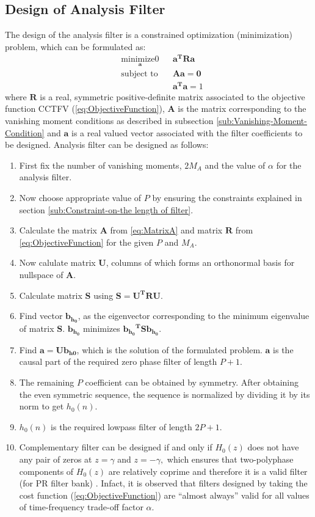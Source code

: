 \subsection{Design of Analysis Filter}
The design of the analysis filter is a constrained optimization (minimization)
problem, which can be formulated as:
\begin{equation*}
\begin{aligned}
& \underset{\mathbf{a}}{\text{minimize0}}
& & \mathbf{a^T}\mathbf{Ra} \\
& \text{subject to}
& & \mathbf{A{a}}=\mathbf{0} \\
&&& \mathbf{{a}^{T}}\mathbf{{a}}=1
\end{aligned}
\end{equation*}
where $\mathbf{R}$ is a real, symmetric positive-definite matrix
associated to the objective function CCTFV (\ref{eq:ObjectiveFunction}),
\textbf{$\mathbf{A}$ }is the matrix corresponding to the vanishing moment conditions as described in subsection \ref{sub:Vanishing-Moment-Condition} and $\mathbf{a}$ is a real
 valued vector associated with the filter coefficients to be designed. Analysis filter can be designed as follows:
\begin{enumerate}
\item First fix the number of vanishing moments, $2M_{A}$ and the value of $\alpha$ for the analysis filter.
\item Now choose appropriate value of $P$ by ensuring the constraints explained in section \ref{sub:Constraint-on-the length of filter}.
\item Calculate the matrix $\mathbf{A}$ from \ref{eq:MatrixA} and matrix $\mathbf{R}$ from \ref{eq:ObjectiveFunction} for the given $P$ and $M_A$.
\item Now calulate matrix $\mathbf{U}$, columns of which forms an orthonormal basis for nullspace of $\mathbf{A}$.
\item Calculate matrix $\mathbf{S}$ using $\mathbf{S=U^{T}RU}$.
\item Find vector $\mathbf{b_{h_0}}$, as the eigenvector corresponding to the minimum eigenvalue of matrix $\mathbf{S}$. $\mathbf{b_{h_0}}$ minimizes $\mathbf{{b_{h_0}}^{T}S{b_{h_0}}}$.
\item Find $\mathbf{a = U{b_{h0}}}$, which is the solution of the formulated problem. $\mathbf{a}$ is the causal part of the required zero phase filter of length $P+1$.
\item  The remaining $P$ coefficient can be obtained by symmetry. After obtaining the even symmetric sequence, the sequence is normalized by dividing it by its norm to get ${h_0(n)}$.
\item ${h_0(n)}$ is the required lowpass filter of length $2P+1$.
\item Complementary filter can be designed if and only if $H_{0}(z)$ does not have any pair of zeros at $z=\gamma$ and $z=-\gamma,$ which ensures that two-polyphase components of $H_{0}(z)$ are relatively coprime and therefore it is a valid filter (for PR filter bank) \cite{key-12}. Infact, it is observed that filters designed by taking the cost function (\ref{eq:ObjectiveFunction}) are {}``almost always'' valid for all values of time-frequency trade-off factor $\alpha$.
\end{enumerate}
